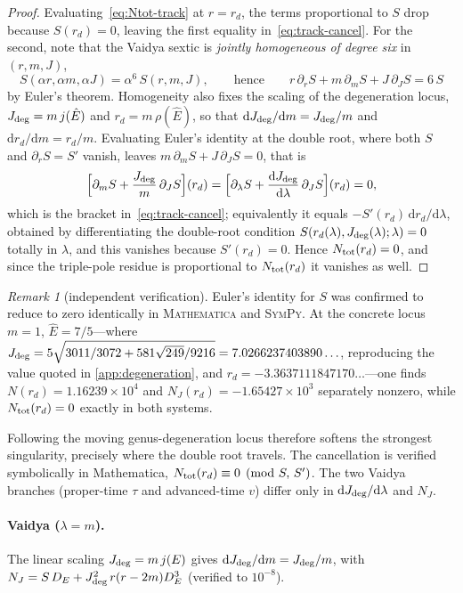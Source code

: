 \documentclass[12pt]{iopart}
\newcommand{\Ehat}{\hat E}
\newcommand{\Jc}{J_{\rm deg}}
\newcommand{\dd}{\mathrm{d}}
\theoremstyle{plain}
\theoremstyle{definition}
\theoremstyle{plain}
\theoremstyle{remark}
\newtheorem*{remark}{Remark}
\begin{document}
\begin{proof}
Evaluating~\eqref{eq:Ntot-track} at $r=r_d$, the terms proportional to $S$ drop because
$S(r_d)=0$, leaving the first equality in~\eqref{eq:track-cancel}. For the second, note
that the Vaidya sextic is \emph{jointly homogeneous of degree six} in $(r,m,J)$,
\[
   S(\alpha r,\alpha m,\alpha J)=\alpha^6\,S(r,m,J),
   \qquad\text{hence}\qquad
   r\,\partial_rS+m\,\partial_mS+J\,\partial_JS=6\,S
\]
by Euler's theorem. Homogeneity also fixes the scaling of the degeneration locus,
$\Jc=m\,j(\Ehat)$ and $r_d=m\,\rho(\Ehat)$, so that $\dd\Jc/\dd m=\Jc/m$ and
$\dd r_d/\dd m=r_d/m$. Evaluating Euler's identity at the double root, where both $S$ and
$\partial_rS=S'$ vanish, leaves $m\,\partial_mS+J\,\partial_JS=0$, that is
\[
   \Big[\partial_mS+\frac{\Jc}{m}\,\partial_JS\Big](r_d)
   =\Big[\partial_\lambda S+\frac{\dd\Jc}{\dd\lambda}\,\partial_JS\Big](r_d)=0 ,
\]
which is the bracket in~\eqref{eq:track-cancel}; equivalently it equals
$-S'(r_d)\,\dd r_d/\dd\lambda$, obtained by differentiating the double-root condition
$S(r_d(\lambda),\Jc(\lambda);\lambda)=0$ totally in $\lambda$, and this vanishes because
$S'(r_d)=0$. Hence $N_{\rm tot}(r_d)=0$, and since the triple-pole residue is proportional
to $N_{\rm tot}(r_d)$ it vanishes as well.
\end{proof}

\begin{remark}[independent verification]
Euler's identity for $S$ was confirmed to reduce to zero identically in
\textsc{Mathematica} and \textsc{SymPy}. At the concrete locus $m=1$, $\Ehat=7/5$---where
$\Jc=5\sqrt{3011/3072+581\sqrt{249}/9216}=7.0266237403890\ldots$, reproducing the value
quoted in \ref{app:degeneration}, and $r_d=-3.3637111847170\ldots$---one finds
$N(r_d)=1.16239\times10^{4}$ and $N_J(r_d)=-1.65427\times10^{3}$ separately nonzero, while
$N_{\rm tot}(r_d)=0$ exactly in both systems.
\end{remark}

Following the moving genus-degeneration locus therefore softens the strongest
singularity, precisely where the double root travels. The cancellation is verified
symbolically in Mathematica, $N_{\rm tot}(r_d)\equiv0\pmod{S,\,S'}$. The two Vaidya
branches (proper-time $\tau$ and advanced-time $v$) differ only in $\dd\Jc/\dd\lambda$
and $N_J$.

\paragraph{Vaidya ($\lambda=m$).}
The linear scaling $\Jc=m\,j(E)$ gives $\dd\Jc/\dd m=\Jc/m$, with
$N_J=S\,D_E+\Jc^2\,r(r-2m)D_E^3$ (verified to $10^{-8}$).
\end{document}
